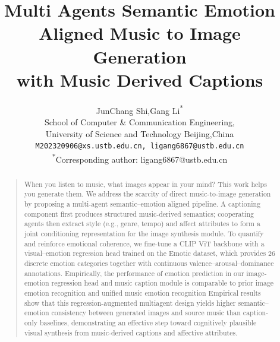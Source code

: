 \documentclass[letterpaper]{article}
\begin{document}
%
\title{Multi Agents Semantic Emotion Aligned Music to Image Generation \\ with Music Derived Captions}
\author{JunChang Shi,Gang Li\textsuperscript{*}\\
School of Computer \& Communication Engineering,\\University of Science and Technology Beijing,China\\
\texttt{M202320906@xs.ustb.edu.cn, ligang6867@ustb.edu.cn}\\
\textsuperscript{*}Corresponding author: ligang6867@ustb.edu.cn
}

\maketitle
\begin{abstract}
\begin{quote}
When you listen to music, what images appear in your mind? 
This work helps you generate them. 
We address the scarcity of direct music-to-image generation by proposing a multi-agent semantic–emotion aligned pipeline. 
A captioning component first produces structured music-derived semantics; cooperating agents then extract style (e.g., genre, tempo) and affect attributes to form a joint conditioning representation for the image synthesis module. 
To quantify and reinforce emotional coherence, we fine-tune a CLIP ViT backbone \cite{dosovitskiy2021vit,radford2021clip} with a visual–emotion regression head trained on the Emotic dataset, which provides 26 discrete emotion categories together with continuous valence–arousal–dominance annotations. 
Empirically, the performance of emotion prediction in our image-emotion regression head and music caption module is comparable to prior image emotion recognition \cite{zhao2020emotion} and unified music emotion recognition \cite{kang2025unified}
Empirical results show that this regression-augmented multiagent design yields higher semantic–emotion consistency between generated images and source music than caption-only baselines, demonstrating an effective step toward cognitively plausible visual synthesis from music-derived captions and affective attributes.
\end{quote}
\end{abstract}
\end{document}
